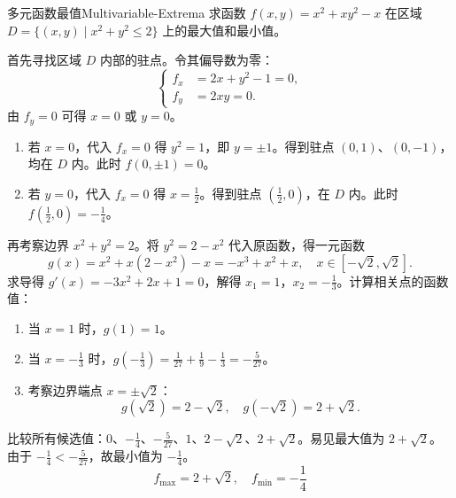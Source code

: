 \begin{problem}{多元函数最值}{Multivariable-Extrema}
    求函数 $f(x,y) = x^2 + xy^2 - x$ 在区域 $D = \{(x,y) \mid x^2 + y^2 \leqslant 2\}$ 上的最大值和最小值。
\end{problem}

\begin{solution}
    首先寻找区域 $D$ 内部的驻点。令其偏导数为零：
    \begin{equation}
        \label{eq:stationary-points}
        \left\{ \begin{aligned}
            f_x & = 2x + y^2 - 1 = 0, \\
            f_y & = 2xy = 0.
        \end{aligned} \right.
    \end{equation}
    由 $f_y = 0$ 可得 $x=0$ 或 $y=0$。

    \begin{enumerate}
        \item 若 $x=0$，代入 $f_x=0$ 得 $y^2 = 1$，即 $y = \pm 1$。得到驻点 $(0, 1)$、$(0, -1)$，均在 $D$ 内。此时 $f(0, \pm 1) = 0$。
        \item 若 $y=0$，代入 $f_x=0$ 得 $x = \frac{1}{2}$。得到驻点 $(\frac{1}{2}, 0)$，在 $D$ 内。此时 $f(\frac{1}{2}, 0) = -\frac{1}{4}$。
    \end{enumerate}

    再考察边界 $x^2 + y^2 = 2$。将 $y^2 = 2 - x^2$ 代入原函数，得一元函数
    \begin{equation}
        g(x) = x^2 + x(2 - x^2) - x = -x^3 + x^2 + x, \quad x \in [-\sqrt{2}, \sqrt{2}].
    \end{equation}
    求导得 $g'(x) = -3x^2 + 2x + 1 = 0$，解得 $x_1 = 1$，$x_2 = -\frac{1}{3}$。计算相关点的函数值：
    \begin{enumerate}
        \item 当 $x=1$ 时，$g(1) = 1$。
        \item 当 $x=-\frac{1}{3}$ 时，$g(-\frac{1}{3}) = \frac{1}{27} + \frac{1}{9} - \frac{1}{3} = -\frac{5}{27}$。
        \item 考察边界端点 $x = \pm \sqrt{2}$：
              \begin{equation}
                  g(\sqrt{2}) = 2 - \sqrt{2}, \quad g(-\sqrt{2}) = 2 + \sqrt{2}.
              \end{equation}
    \end{enumerate}

    比较所有候选值：$0$、$-\frac{1}{4}$、$-\frac{5}{27}$、$1$、$2-\sqrt{2}$、$2+\sqrt{2}$。易见最大值为 $2+\sqrt{2}$。由于 $-\frac{1}{4} < -\frac{5}{27}$，故最小值为 $-\frac{1}{4}$。
    \begin{equation}
        \boxed{f_{\max} = 2 + \sqrt{2}, \quad f_{\min} = -\frac{1}{4}}
    \end{equation}
\end{solution}


